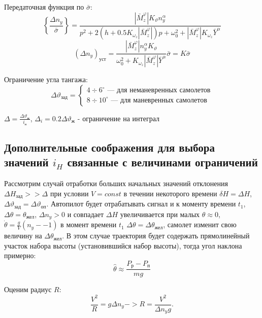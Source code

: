 \documentclass{article}
\begin{document}
Передаточная функция по $\bar{\sigma}$:
\[
	\left\{\frac{\Delta n_y}{\bar{\sigma}} \right\} =\frac{|\bar{M}_z^\varphi|
	K_{\vartheta} n_y^\alpha}{ p^2 + 2(h + 0.5 K_{\omega_z} |
	\bar{M}_z^{\varphi} |)p + \omega_0^2 + | \bar{M}_z^{\varphi}| K_{\omega_z}
	\bar{Y}^\alpha}
\]
\[
	\left( \Delta n_y\right)_\text{уст} = \frac{| \bar{M}_z^{\varphi}|
	n_y^\alpha K_\vartheta}{\omega_0^2 + K_{\omega_z} | \bar{M}_z^{\varphi} |
	\bar{Y}^\alpha} \bar{\sigma} = K \bar{\sigma}
\]

Ограничение угла тангажа:
\begin{equation}
	\Delta \vartheta_\text{зад} =
	\begin{cases}
		4 \div 6^\circ \text{ --- для неманевренных самолетов} \\
		8 \div 10^\circ \text{ --- для маневренных самолетов}
	\end{cases}
\end{equation}

$\Delta =\frac{\Delta \vartheta_\text{ж}}{i_\text{н}}$, $\Delta_i = 0.2 \Delta
	\vartheta_\text{ж}$ - ограничение на интеграл

\subsection{Дополнительные соображения для выбора значений
	\texorpdfstring{$i_H$}{Lg} связанные с величинами ограничений}
Рассмотрим случай отработки больших начальных значений отклонения $\Delta
	H_\text{зад} >> \Delta$ при условии $V = const$ в течении некоторого времени
$\delta H = \Delta H$, $\Delta \vartheta_\text{зад}  = \Delta
	\vartheta_\text{оп}$. Автопилот будет отрабатывать сигнал и к моменту времени
$t_1$, $\Delta \theta = \theta_\text{жел}$, $ \Delta n_y  >0 $ и совпадает
$\Delta H$ увеличивается при малых $\theta \approx 0$, $ \dot{\theta} =
	\frac{g}{V}(n_y - -1)$ в момент времени $t_1$ $\Delta \theta = \Delta
	\theta_\text{жел}$, самолет изменит свою величину на $\Delta
	\theta_\text{жел}$. В этом случае траектория будет содержать прямолинейный
участок набора высоты (установившийся набор высоты), тогда угол наклона
примерно:
\[
	\hat{\theta} \approx \frac{P_\text{р} - P_\text{п}}{mg}
\]

\begin{figure}[H]
	\centering
	\label{fig:fig_43}
\end{figure}

Оценим радиус $R$:
\[
	\frac{V^2}{R} = g \Delta n_y -> R = \frac{V^2}{ \Delta n_y g}
	.\]
\end{document}
